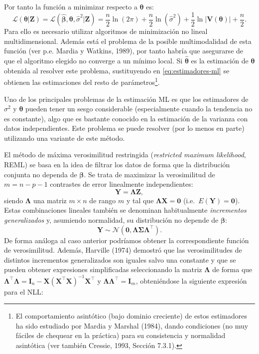 \documentclass[
  spanish,
]{book}
\theoremstyle{break}
\theoremstyle{definition}
\theoremstyle{definition}
\theoremstyle{definition}
\theoremstyle{definition}
\theoremstyle{remark}
\begin{document}
Por tanto la función a minimizar respecto a \(\boldsymbol{\theta}\) es:
\[\mathcal{L}(\boldsymbol{\theta}\left| \mathbf{Z}\right. )=\mathcal{L}(\hat{\boldsymbol{\beta}} ,\boldsymbol{\theta},\hat{\sigma }^2 \left|
\mathbf{Z}\right. ) = \dfrac{n}{2} \ln (2\pi ) + \dfrac{n}{2} \ln (\hat{\sigma
}^2) + \dfrac{1}{2} \ln \left| \mathbf{V}(\boldsymbol{\theta})\right| +\dfrac{n}{2}.\]
Para ello es necesario utilizar algoritmos de minimización no lineal multidimensional.
Además está el problema de la posible multimodalidad de esta función (ver p.e. Mardia y Watkins, 1989), por tanto habría que asegurarse de que el algoritmo elegido no converge a un mínimo local.
Si \(\hat{\boldsymbol{\theta}}\) es la estimación de \(\boldsymbol{\theta}\) obtenida al resolver este problema, sustituyendo en \eqref{eq:estimadores-ml} se obtienen las estimaciones del resto de parámetros\footnote{El comportamiento asintótico (bajo dominio creciente) de estos estimadores ha sido estudiado por Mardia y Marshal (1984), dando condiciones (no muy fáciles de chequear en la práctica) para su consistencia y normalidad asintótica (ver también Cressie, 1993, Sección 7.3.1).}.

Uno de los principales problemas de la estimación ML es que los estimadores de \(\sigma^2\) y \(\boldsymbol{\theta}\) pueden tener un sesgo considerable (especialmente cuando la tendencia no es constante), algo que es bastante conocido en la estimación de la varianza con datos independientes.
Este problema se puede resolver (por lo menos en parte) utilizando una variante de este método.

El método de máxima verosimilitud restringida (\emph{restricted maximum likelihood}, REML) se basa en la idea de filtrar los datos de forma que la distribución conjunta no dependa de \(\boldsymbol{\beta}\).
Se trata de maximizar la verosimilitud de \(m=n-p-1\) contrastes de error linealmente independientes:
\[\mathbf{Y}=\boldsymbol{\Lambda}\mathbf{Z},\]
siendo \(\boldsymbol{\Lambda}\) una matriz \(m\times n\) de rango \(m\) y tal que \(\boldsymbol{\Lambda}\mathbf{X}=\mathbf{0}\) (i.e.~\(E(\mathbf{Y}) = \mathbf{0}\)).
Estas combinaciones lineales también se denominan habitualmente \emph{incrementos generalizados} y, asumiendo normalidad, su distribución no depende de \(\boldsymbol{\beta}\):
\[\mathbf{Y}\sim \mathcal{N}(\mathbf{0},\boldsymbol{\Lambda}\boldsymbol{\Sigma}\boldsymbol{\Lambda}^\top).\]
De forma análoga al caso anterior podríamos obtener la correspondiente función de verosimilitud. Además, Harville (1974) demostró que las verosimilitudes de distintos incrementos generalizados son iguales salvo una constante y que se pueden obtener expresiones simplificadas
seleccionando la matriz \(\boldsymbol{\Lambda}\) de forma que \(\boldsymbol{\Lambda}^\top \boldsymbol{\Lambda}=\mathbf{I}_{n} -\mathbf{X}(\mathbf{X^\top}\mathbf{X})^{-1} \mathbf{X}^\top\) y \(\boldsymbol{\Lambda}\boldsymbol{\Lambda}^\top =\mathbf{I}_{m}\), obteniéndose la siguiente expresión para el NLL:
\end{document}
